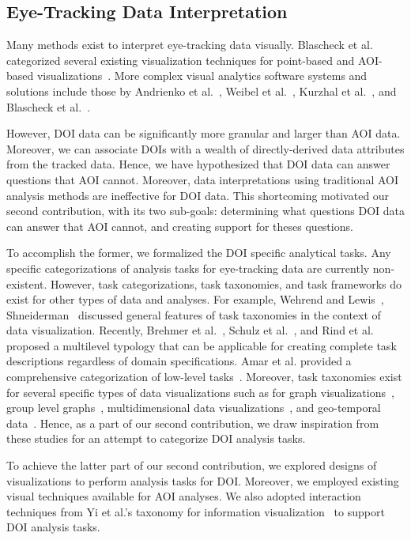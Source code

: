 \subsection{Eye-Tracking Data Interpretation}
Many methods exist to interpret eye-tracking data visually. Blascheck et al. categorized several existing visualization techniques for point-based and AOI-based visualizations~\cite{Bla14}. More complex visual analytics software systems and solutions include those by Andrienko et al.~\cite{And12}, Weibel et al.~\cite{Wei12}, Kurzhal et al.~\cite{Kur14}, and Blascheck et al.~\cite{Bla16}.

However, DOI data can be significantly more granular and larger than AOI data. Moreover, we can associate DOIs with a wealth of directly-derived data attributes from the tracked data. Hence, we have hypothesized that DOI data can answer questions that AOI cannot. Moreover, data interpretations using traditional AOI analysis methods are ineffective for DOI data. This shortcoming motivated our second contribution, with its two sub-goals: determining what questions DOI data can answer that AOI cannot, and creating support for theses questions. 
 
To accomplish the former, we formalized the DOI specific analytical tasks. Any specific categorizations of analysis tasks for eye-tracking data are currently non-existent. However, task categorizations, task taxonomies, and task frameworks do exist for other types of data and analyses. For example, Wehrend and Lewis~\cite{Weh90}, Shneiderman~\cite{Shne96} discussed general features of task taxonomies in the context of data visualization. Recently, Brehmer et al.~\cite{Bre13}, Schulz et al.~\cite{Sch13}, and Rind et al.~\cite{Rind15} proposed a multilevel typology that can be applicable for creating complete task descriptions regardless of domain specifications. Amar et al. provided a comprehensive categorization of low-level tasks~\cite{Ama05}. Moreover, task taxonomies exist for several specific types of data visualizations such as for graph visualizations~\cite{Lee06}, group level graphs~\cite{Sak14}, multidimensional data visualizations~\cite{Ward02}, and geo-temporal data~\cite{And03, Roth13}. Hence, as a part of our second contribution, we draw inspiration from these studies for an attempt to categorize DOI analysis tasks. 

To achieve the latter part of our second contribution, we explored designs of visualizations to perform analysis tasks for DOI. Moreover, we employed existing visual techniques available for AOI analyses. We also adopted interaction techniques from Yi et al.'s taxonomy for information visualization~\cite{Yi07} to support DOI analysis tasks.  
